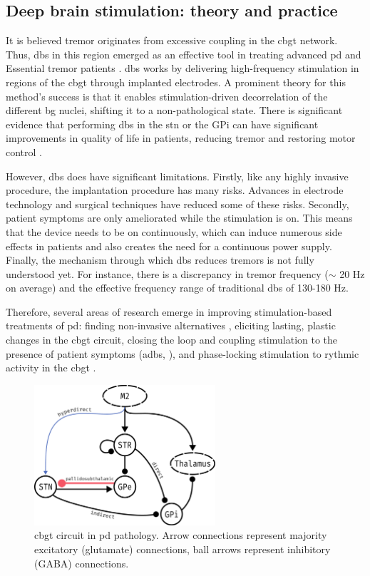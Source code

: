 \subsection{Deep brain stimulation: theory and practice}
It is believed tremor originates from excessive coupling in the \acrshort{cbgt} network.
Thus, \acrshort{dbs} in this region emerged as an effective tool in treating advanced \acrshort{pd} and Essential tremor
patients \cite{del2018advances}.
\acrshort{dbs} works by delivering high-frequency stimulation in regions of the \acrshort{cbgt}
through implanted electrodes.
A prominent theory for this method's success is that it enables stimulation-driven
decorrelation of the different \acrshort{bg} nuclei, shifting it to a non-pathological state.
There is significant evidence that performing \acrshort{dbs} in the \acrshort{stn} or the GPi can have significant improvements in
quality of life in patients, reducing tremor and restoring motor control
\cite{rodriguez2005bilateral, rubin2004high}.

However, \acrshort{dbs} does have significant limitations. Firstly, like any highly invasive procedure, the implantation procedure has many risks.
Advances in electrode technology and surgical techniques have reduced some of these risks.
Secondly, patient symptoms are only ameliorated while the stimulation is on. This means that
the device needs to be on continuously, which can induce numerous side effects in patients and also creates the need for a continuous power supply.
Finally, the mechanism through which \acrshort{dbs} reduces tremors is not fully understood yet.
For instance, there is a discrepancy in tremor frequency ($\sim$ 20 Hz on average) and the effective frequency range of
traditional \acrshort{dbs} of 130-180 Hz.

Therefore, several areas of research emerge in improving stimulation-based treatments of \acrshort{pd}:
finding non-invasive alternatives \cite{saturnino2017target, schwab2020spike}, eliciting lasting,
plastic changes in the \acrshort{cbgt} circuit, closing the loop and coupling stimulation to the presence of
patient symptoms (\acrfull{adbs}, \cite{beudel2018adaptive}), and phase-locking stimulation to
rythmic activity in the \acrshort{cbgt} \cite{cagnan2017stimulating, west2022stimulating}.

\begin{figure}[ht]
	\centering
	\includegraphics[width=0.6\textwidth]{figs/cbgt_circuit.pdf}
	\caption{\acrshort{cbgt} circuit in \acrshort{pd} pathology. Arrow connections represent majority excitatory (glutamate) connections,
		ball arrows represent inhibitory (GABA) connections.}
\end{figure}

